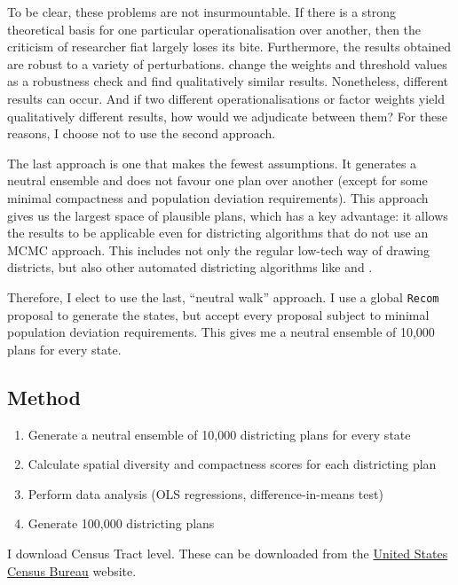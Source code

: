 \documentclass[]{article}
\begin{document}
To be clear, these problems are not insurmountable. If there is a strong
theoretical basis for one particular operationalisation over another,
then the criticism of researcher fiat largely loses its bite.
Furthermore, the results obtained are robust to a variety of
perturbations. \cite{h2018} change the weights and threshold values as a
robustness check and find qualitatively similar results. Nonetheless,
different results can occur. And if two different operationalisations or
factor weights yield qualitatively different results, how would we
adjudicate between them? For these reasons, I choose not to use the
second approach.

The last approach is one that makes the fewest assumptions. It generates
a neutral ensemble and does not favour one plan over another (except for
some minimal compactness and population deviation requirements). This
approach gives us the largest space of plausible plans, which has a key
advantage: it allows the results to be applicable even for districting
algorithms that do not use an MCMC approach. This includes not only the
regular low-tech way of drawing districts, but also other automated
districting algorithms like \cite{mm2018} and \cite{lf2019}.

Therefore, I elect to use the last, ``neutral walk'' approach. I use a
global \texttt{Recom} proposal to generate the states, but accept every
proposal subject to minimal population deviation requirements. This
gives me a neutral ensemble of 10,000 plans for every state.

\hypertarget{method}{%
\subsection{Method}\label{method}}

\begin{enumerate}
\def\labelenumi{\arabic{enumi}.}
\item
  Generate a neutral ensemble of 10,000 districting plans for every
  state
\item
  Calculate spatial diversity and compactness scores for each
  districting plan
\item
  Perform data analysis (OLS regressions, difference-in-means test)
\item
  Generate 100,000 districting plans
\end{enumerate}

I download Census Tract level. These can be downloaded from the
\href{census.gov}{United States Census Bureau} website.
\end{document}
